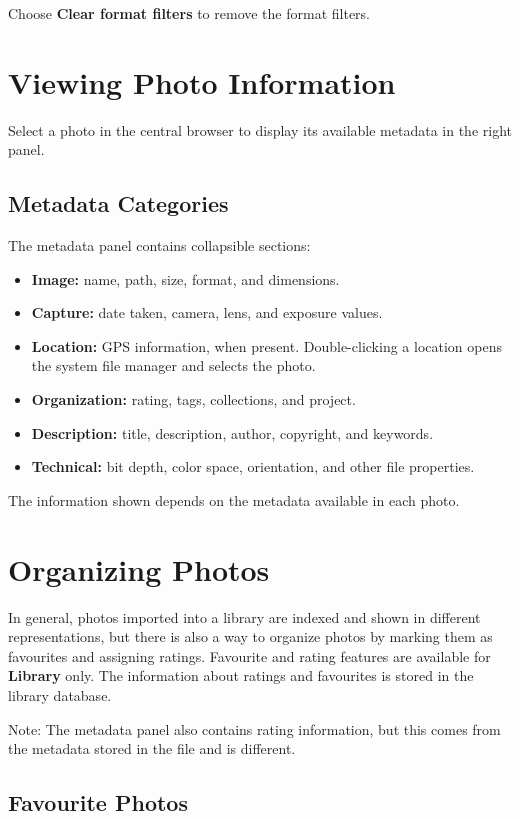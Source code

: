 \documentclass[11pt]{article}
\begin{document}
Choose \textbf{Clear format filters} to remove the format filters.

\section{Viewing Photo Information}

Select a photo in the central browser to display its available metadata in
the right panel.

\subsection{Metadata Categories}

The metadata panel contains collapsible sections:
\begin{itemize}
  \item \textbf{Image:} name, path, size, format, and dimensions.
  \item \textbf{Capture:} date taken, camera, lens, and exposure values.
  \item \textbf{Location:} GPS information, when present. Double-clicking a
        location opens the system file manager and selects the photo.
  \item \textbf{Organization:} rating, tags, collections, and project.
  \item \textbf{Description:} title, description, author, copyright, and
        keywords.
  \item \textbf{Technical:} bit depth, color space, orientation, and other
        file properties.
\end{itemize}

The information shown depends on the metadata available in each photo.

\section{Organizing Photos}

In general, photos imported into a library are indexed and shown
in different representations, but there is also a way to organize photos by
marking them as favourites and assigning ratings. Favourite and rating
features are available for \textbf{Library} only. The information about
ratings and favourites is stored in the library database.

Note: The metadata panel also contains rating information, but this comes
from the metadata stored in the file and is different.

\subsection{Favourite Photos}
\end{document}
